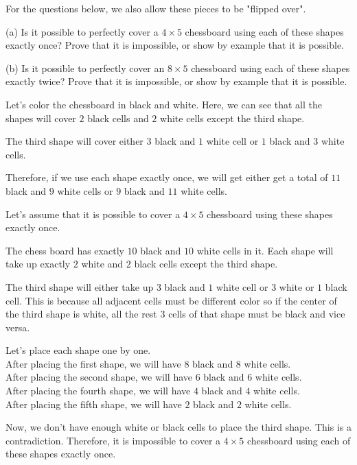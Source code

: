 	For the questions below, we also allow these pieces to be "flipped over".

	(a) Is it possible to perfectly cover a $4 \times 5$ chessboard using each of these shapes exactly once? Prove that it is impossible, or show by example that it is possible.

	(b) Is it possible to perfectly cover an $8 \times 5$ chessboard using each of these shapes exactly twice? Prove that it is impossible, or show by example that it is possible.
\ep 

\begin{scratch}
	Let's color the chessboard in black and white. Here, we can see that all the shapes will cover $2$ black cells and $2$ white cells except the third shape.

	The third shape will cover either $3$ black and $1$ white cell or $1$ black and $3$ white cells.

	Therefore, if we use each shape exactly once, we will get either get a total of $11$ black and $9$ white cells or $9$ black and $11$ white cells.
\end{scratch}

\bs[a]
	Let's assume that it is possible to cover a $4 \times 5$ chessboard using these shapes exactly once.

	The chess board has exactly $10$ black and $10$ white cells in it. Each shape will take up exactly $2$ white and $2$ black cells except the third shape. 

	The third shape will either take up $3$ black and $1$ white cell or $3$ white or $1$ black cell. This is because all adjacent cells must be different color so if the center of the third shape is white, all the rest $3$ cells of that shape must be black and vice versa.

	Let's place each shape one by one. \\
	After placing the first shape, we will have $8$ black and $8$ white cells. \\
	After placing the second shape, we will have $6$ black and $6$ white cells. \\
	After placing the fourth shape, we will have $4$ black and $4$ white cells. \\
	After placing the fifth shape, we will have $2$ black and $2$ white cells.

	Now, we don't have enough white or black cells to place the third shape.
	This is a contradiction. Therefore, it is impossible to cover a $4 \times 5$ chessboard using each of these shapes exactly once.

